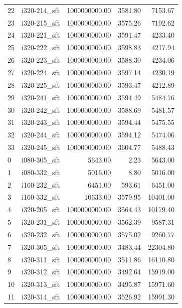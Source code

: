 \begin{tabular}{llrrr}
22 &  i320-214\_sft & 1000000000.00 &           3581.80 &     7153.67 \\
23 &  i320-215\_sft & 1000000000.00 &           3575.26 &     7192.62 \\
24 &  i320-221\_sft & 1000000000.00 &           3591.47 &     4233.40 \\
25 &  i320-222\_sft & 1000000000.00 &           3598.83 &     4217.94 \\
26 &  i320-223\_sft & 1000000000.00 &           3588.30 &     4234.06 \\
27 &  i320-224\_sft & 1000000000.00 &           3597.14 &     4230.19 \\
28 &  i320-225\_sft & 1000000000.00 &           3593.47 &     4212.89 \\
29 &  i320-241\_sft & 1000000000.00 &           3594.49 &     5484.76 \\
30 &  i320-242\_sft & 1000000000.00 &           3588.69 &     5481.57 \\
31 &  i320-243\_sft & 1000000000.00 &           3594.44 &     5475.55 \\
32 &  i320-244\_sft & 1000000000.00 &           3594.12 &     5474.06 \\
33 &  i320-245\_sft & 1000000000.00 &           3604.77 &     5488.43 \\
0  &  i080-305\_sft &       5643.00 &              2.23 &     5643.00 \\
1  &  i080-332\_sft &       5016.00 &              8.80 &     5016.00 \\
2  &  i160-232\_sft &       6451.00 &            593.61 &     6451.00 \\
3  &  i160-332\_sft &      10633.00 &           3579.95 &    10401.00 \\
4  &  i320-205\_sft & 1000000000.00 &           3564.43 &    10179.40 \\
5  &  i320-231\_sft & 1000000000.00 &           3562.39 &     9587.31 \\
6  &  i320-232\_sft & 1000000000.00 &           3575.02 &     9260.77 \\
7  &  i320-305\_sft & 1000000000.00 &           3483.44 &    22304.80 \\
8  &  i320-311\_sft & 1000000000.00 &           3511.86 &    16110.80 \\
9  &  i320-312\_sft & 1000000000.00 &           3492.64 &    15919.00 \\
10 &  i320-313\_sft & 1000000000.00 &           3495.87 &    15971.60 \\
11 &  i320-314\_sft & 1000000000.00 &           3526.92 &    15991.30 \\

\end{tabular}
